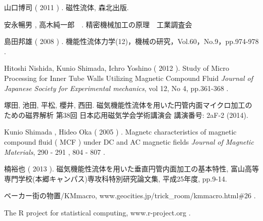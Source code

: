 \documentclass[11pt]{jarticle}
\begin{document}
  \begin{thebibliography}{99}



 山口博司 ( 2011 ) .  磁性流体, 森北出版.

 安永暢男 , 高木純一郎　. 精密機械加工の原理　工業調査会　

 島田邦雄 ( 2008 ) .  機能性流体力学(12)，機械の研究，Vol.60，No.9，pp.974-978 .

 Hitoshi Nishida, Kunio Shimada, Ichro Yoshino ( 2012 ). Study of Micro Processing for Inner Tube Walls Utilizing Magnetic Compound Fluid {\it Journal of Japanese Society for Experimental mechanics}, vol 12, No 4, pp.361-368 .   

 塚田, 池田, 平松, 櫻井, 西田. 磁気機能性流体を用いた円管内面マイクロ加工のための磁界解析 第38回 日本応用磁気学会学術講演会 講演番号: 2aF-2 (2014).

 Kunio Shimada , Hideo Oka ( 2005 ) . Magnetc characteristics of magnetic compound fluid ( MCF ) under DC and AC magnetic fields { \it Journal of Magnetic Materials}, 290 - 291 , 804 - 807 .

 楠裕也 ( 2013 ).  磁気機能性流体を用いた垂直円管内面加工の基本特性, 富山高等専門学校(本郷キャンパス)専攻科特別研究論文集, 平成25年度, pp.9-14. 

 ベーカー街の物置/KMmacro, www.geocities.jp/trick\_room/kmmacro.html\#26 .

 The R project for statistical computing, www.r-project.org .

  \end{thebibliography}

\newpage
\end{document}
